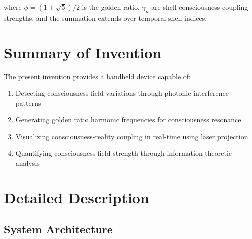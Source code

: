 \documentclass[12pt,a4paper]{article}
\begin{document}
where $\phi = (1+\sqrt{5})/2$ is the golden ratio, $\gamma_n$ are shell-consciousness coupling strengths, and the summation extends over temporal shell indices.

\section{Summary of Invention}

The present invention provides a handheld device capable of:
\begin{enumerate}
\item Detecting consciousness field variations through photonic interference patterns
\item Generating golden ratio harmonic frequencies for consciousness resonance
\item Visualizing consciousness-reality coupling in real-time using laser projection
\item Quantifying consciousness field strength through information-theoretic analysis
\end{enumerate}

\section{Detailed Description}

\subsection{System Architecture}
\end{document}
